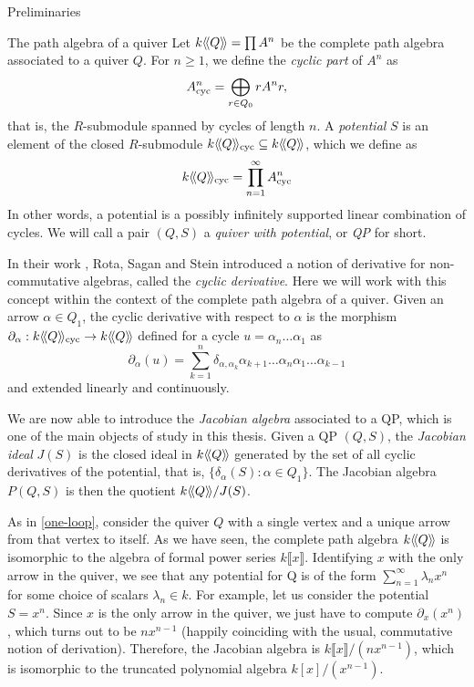 \begin{chapter}{Preliminaries}
\begin{section}{The path algebra of a quiver}
Let $k\langle\!\langle Q\rangle\!\rangle=\prod A^n$ be the complete path algebra associated to a quiver $Q$. For $n\geq 1$, we define the \emph{cyclic part} of $A^n$ as
\[
A^n_{\mathrm{cyc}} = \bigoplus_{r\in Q_0} rA^nr,
\]
that is, the $R$-submodule spanned by cycles of length $n$. A \emph{potential} $S$ is an element of the closed  $R$-submodule $k\langle\!\langle Q\rangle\!\rangle_{\mathrm{cyc}}\subseteq k\langle\!\langle Q\rangle\!\rangle$, which we define as
\[
k\langle\!\langle Q\rangle\!\rangle_{\mathrm{cyc}}=\prod_{n=1}^\infty A^n_{\mathrm{cyc}}
\]
In other words, a potential is a possibly infinitely supported linear combination of cycles. We will call a pair $(Q,S)$ a \emph{quiver with potential}, or \emph{QP} for short.

In their work \cite{RSS80}, Rota, Sagan and Stein introduced a notion of derivative for non-commutative algebras, called the \emph{cyclic derivative}. Here we will work with this concept within the context of the complete path algebra of a quiver. Given an arrow $\alpha\in Q_1$, the cyclic derivative with respect to $\alpha$ is the morphism $\partial_\alpha:k\langle\!\langle Q\rangle\!\rangle_{\mathrm{cyc}}\to k\langle\!\langle Q\rangle\!\rangle$ defined for a cycle $u=\alpha_n\dots\alpha_1$ as
\[
\partial_\alpha(u) = \sum_{k=1}^n \delta_{\alpha, \alpha_k}\alpha_{k+1}\dots\alpha_n\alpha_1\dots\alpha_{k-1}
\]
and extended linearly and continuously.

We are now able to introduce the \emph{Jacobian algebra} associated to a QP, which is one of the main objects of study in this thesis. Given a QP $(Q,S)$, the \emph{Jacobian ideal} $J(S)$ is the closed ideal in $k\langle\!\langle Q\rangle\!\rangle$ generated by the set of all cyclic derivatives of the potential, that is, $\{\delta_\alpha(S) : \alpha\in Q_1\}$. The Jacobian algebra $P(Q,S)$ is then the quotient $k\langle\!\langle Q\rangle\!\rangle/J(S)$.

\begin{exmp} As in \ref{one-loop}, consider the quiver $Q$ with a single vertex and a unique arrow from that vertex to itself. As we have seen, the complete path algebra $k\langle\!\langle Q\rangle\!\rangle$ is isomorphic to the algebra of formal power series $k\llbracket x\rrbracket$. Identifying $x$ with the only arrow in the quiver, we see that any potential for Q is of the form $\sum_{n=1}^\infty \lambda_n x^n$ for some choice of scalars $\lambda_n\in k$. For example, let us consider the potential $S=x^n$. Since $x$ is the only arrow in the quiver, we just have to compute $\partial_x(x^n)$, which turns out to be $nx^{n-1}$ (happily coinciding with the usual, commutative notion of derivation). Therefore, the Jacobian algebra is $k\llbracket x\rrbracket/(nx^{n-1})$, which is isomorphic to the truncated polynomial algebra $k[x]/(x^{n-1})$.
\end{exmp}


\end{section}
\end{chapter}
